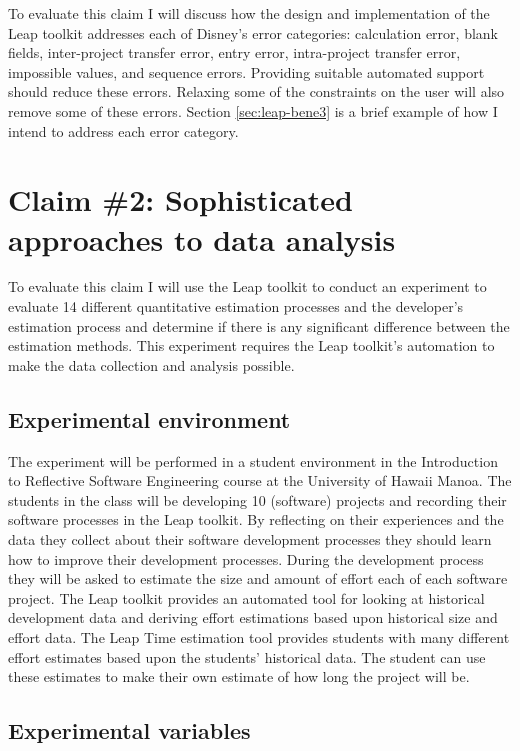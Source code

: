 To evaluate this claim I will discuss how the design and implementation of the
Leap toolkit addresses each of Disney's error categories: calculation error,
blank fields, inter-project transfer error, entry error, intra-project transfer
error, impossible values, and sequence errors.  Providing suitable automated
support should reduce these errors.  Relaxing some of the constraints on the
user will also remove some of these errors. Section \ref{sec:leap-bene3}
is a brief example of how I intend to address each error category.

\section{Claim \#2: Sophisticated approaches to data analysis}

To evaluate this claim I will use the Leap toolkit to conduct an experiment to
evaluate 14 different quantitative estimation processes and the developer's
estimation process and determine if there is any significant difference between
the estimation methods. This experiment requires the Leap toolkit's automation
to make the data collection and analysis possible.  


\subsection{Experimental environment}

The experiment will be performed in a student environment in the Introduction
to Reflective Software Engineering course at the University of Hawaii Manoa.
The students in the class will be developing 10 (software) projects and
recording their software processes in the Leap toolkit.  By reflecting on their
experiences and the data they collect about their software development
processes they should learn how to improve their development processes.  During
the development process they will be asked to estimate the size and amount of
effort each of each software project.  The Leap toolkit provides an automated
tool for looking at historical development data and deriving effort estimations
based upon historical size and effort data.  The Leap Time estimation tool
provides students with many different effort estimates based upon the students'
historical data.  The student can use these estimates to make their own
estimate of how long the project will be.

\subsection{Experimental variables}

